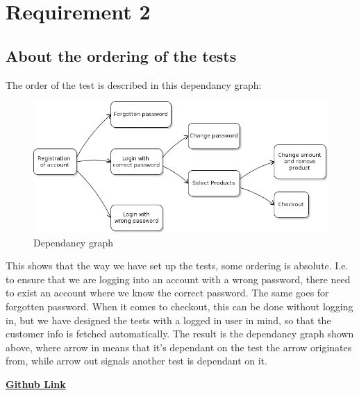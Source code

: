 \documentclass[UKenglish,12pt]{article}
\begin{document}
\section{Requirement 2}
\subsection{About the ordering of the tests}
The order of the test is described in this dependancy graph:

\begin{figure}[!htbp]
	\centering
	\includegraphics[scale=0.6,keepaspectratio]{Images/dependancygraph.png}
	\caption{Dependancy graph}
\end{figure}

This shows that the way we have set up the tests, some ordering is absolute. I.e. to ensure that we are logging into an account with a wrong password, there need to exist an account where we know the correct password. The same goes for forgotten password. When it comes to checkout, this can be done without logging in, but we have designed the tests with a logged in user in mind, so that the customer info is fetched automatically. The result is the dependancy graph shown above, where arrow in means that it's dependant on the test the arrow originates from, while arrow out signals another test is dependant on it.

\vspace{0.5cm}
\href{https://github.com/sebasso/INF4121-Project2}{\textbf{\Large{Github Link}}}
\end{document}
